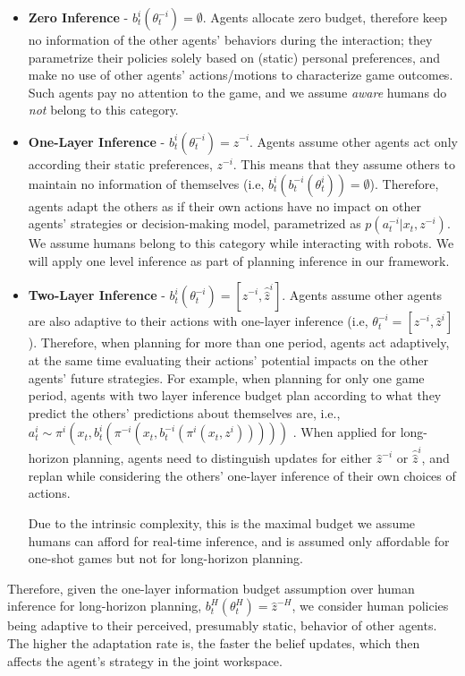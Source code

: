 \documentclass[letterpaper, 10 pt, conference]{ieeeconf}  %
\begin{document}
\begin{itemize}
	\item \textbf{Zero Inference} - $b^i_t(\theta^{-i}_t) = \emptyset$. Agents allocate zero budget, therefore keep no information of the other agents' behaviors during the interaction; they 
    parametrize their policies solely based on (static) personal preferences, and make no use of other agents' actions/motions to characterize game outcomes. Such agents pay no attention to the game, and we assume \textit{aware} humans do \textit{not} belong to this category.
	\item \textbf{One-Layer Inference} - $b^i_t(\theta^{-i}_t) = \hat{z}^{-i}$. 
    Agents assume other agents act only according their static 
    preferences, $z^{-i}$. This means that they assume others to maintain no information of themselves (i.e, $b^i_t(b^{-i}_t(\theta^i_t))=\emptyset$).  
    Therefore, agents adapt the others as if their own actions have no 
    impact on other agents' strategies or decision-making model, parametrized 
    as 
    $p(a^{-i}_{t}|x_t, z^{-i})$. We assume humans belong to this 
    category while interacting with robots. We will apply one level inference as part of planning inference in our framework.
	\item \textbf{Two-Layer Inference} - $b^i_t(\theta^{-i}_t) = [\hat{z}^{-i}, \hat{\hat{z}}^i]$. Agents assume other agents are also adaptive to their actions with one-layer inference (i.e,
	$\theta^{-i}_t = [z^{-i}, \hat{z}^{i}]$). 
    Therefore, when planning for more than one period, agents act adaptively, 
    at the same time evaluating their actions' potential impacts on the 
    other agents' future strategies. For example, when planning for only one game period, 
    agents with two layer inference budget plan according to 
    what they 
    predict the others' predictions about themselves are, i.e.,
    $a^i_t \sim \pi^i(x_t, b^i_t(\pi^{-i}(x_t,b^{-i}_t(\pi^i(x_t,{z}^i)))))$
    . When applied for long-horizon planning, agents need to distinguish 
    updates for either $\hat{z}^{-i}$ or $\hat{\hat{z}}^i$, and replan while 
    considering the others' one-layer inference of their own choices of 
    actions. 
    
    Due to the intrinsic complexity, this is the maximal budget we assume 
    humans can afford for real-time inference, and is assumed only 
    affordable for one-shot games but not for long-horizon planning. 
\end{itemize}

Therefore, given the one-layer information budget assumption over human inference for long-horizon 
planning, $b^H_t(\theta^H_t) = \hat{z}^{-H}$, we consider human policies 
being adaptive to their perceived, presumably static, behavior of other 
agents. The higher the adaptation rate is, the faster the belief updates, 
which then affects the agent's strategy in the joint workspace. 
\end{document}
